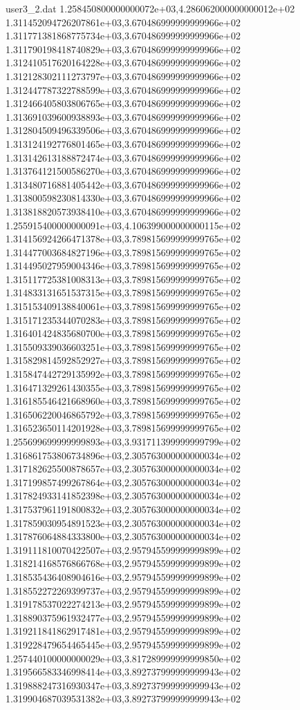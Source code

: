 \begin{filecontents}{user3_2.dat}
1.258450800000000072e+03,4.286062000000000012e+02
1.311452094726207861e+03,3.670486999999999966e+02
1.311771381868775734e+03,3.670486999999999966e+02
1.311790198418740829e+03,3.670486999999999966e+02
1.312410517620164228e+03,3.670486999999999966e+02
1.312128302111273797e+03,3.670486999999999966e+02
1.312447787322788599e+03,3.670486999999999966e+02
1.312466405803806765e+03,3.670486999999999966e+02
1.313691039600938893e+03,3.670486999999999966e+02
1.312804509496339506e+03,3.670486999999999966e+02
1.313124192776801465e+03,3.670486999999999966e+02
1.313142613188872474e+03,3.670486999999999966e+02
1.313764121500586270e+03,3.670486999999999966e+02
1.313480716881405442e+03,3.670486999999999966e+02
1.313800598230814330e+03,3.670486999999999966e+02
1.313818820573938410e+03,3.670486999999999966e+02
1.255915400000000091e+03,4.106399000000000115e+02
1.314156924266471378e+03,3.789815699999999765e+02
1.314477003684827196e+03,3.789815699999999765e+02
1.314495027959004346e+03,3.789815699999999765e+02
1.315117725381008313e+03,3.789815699999999765e+02
1.314833131651537315e+03,3.789815699999999765e+02
1.315153409138840061e+03,3.789815699999999765e+02
1.315171235344070283e+03,3.789815699999999765e+02
1.316401424835680700e+03,3.789815699999999765e+02
1.315509339036603251e+03,3.789815699999999765e+02
1.315829814592852927e+03,3.789815699999999765e+02
1.315847442729135992e+03,3.789815699999999765e+02
1.316471329261430355e+03,3.789815699999999765e+02
1.316185546421668960e+03,3.789815699999999765e+02
1.316506220046865792e+03,3.789815699999999765e+02
1.316523650114201928e+03,3.789815699999999765e+02
1.255699699999999893e+03,3.931711399999999799e+02
1.316861753806734896e+03,2.305763000000000034e+02
1.317182625500878657e+03,2.305763000000000034e+02
1.317199857499267864e+03,2.305763000000000034e+02
1.317824933141852398e+03,2.305763000000000034e+02
1.317537961191800832e+03,2.305763000000000034e+02
1.317859030954891523e+03,2.305763000000000034e+02
1.317876064884333800e+03,2.305763000000000034e+02
1.319111810070422507e+03,2.957945599999999899e+02
1.318214168576866768e+03,2.957945599999999899e+02
1.318535436408904616e+03,2.957945599999999899e+02
1.318552272269399737e+03,2.957945599999999899e+02
1.319178537022274213e+03,2.957945599999999899e+02
1.318890375961932477e+03,2.957945599999999899e+02
1.319211841862917481e+03,2.957945599999999899e+02
1.319228479654465445e+03,2.957945599999999899e+02
1.257440100000000029e+03,3.817289999999999850e+02
1.319566583346998414e+03,3.892737999999999943e+02
1.319888247316930347e+03,3.892737999999999943e+02
1.319904687039531382e+03,3.892737999999999943e+02

\end{filecontents}
